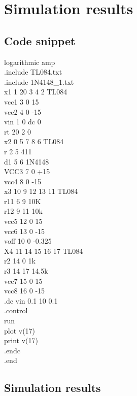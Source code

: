 \documentclass[12pt]{article}
\begin{document}



\section{Simulation results}%
\subsection{Code snippet}
logarithmic amp\\
.include TL084.txt\\
.include 1N4148\_1.txt\\

x1 1 20 3 4 2 TL084\\
vcc1 3 0 15\\
vcc2 4 0 -15\\
vin 1 0 dc 0\\
rt 20 2 0\\
x2 0 5 7 8 6 TL084\\ 
r 2 5 411\\
d1 5 6 1N4148\\
VCC3 7 0 +15\\
vcc4 8 0 -15\\
x3 10 9 12 13 11 TL084\\
r11 6 9 10K\\
r12 9 11 10k\\
vcc5 12 0 15\\
vcc6 13 0 -15\\
voff 10 0 -0.325\\
X4 11 14 15 16 17 TL084\\
r2 14 0 1k\\
r3 14 17 14.5k\\
vcc7 15 0 15\\
vcc8 16 0 -15\\
.dc vin 0.1 10 0.1\\
.control\\
run\\
plot v(17)\\ 
print v(17)\\
.endc \\
.end\\







\subsection{Simulation results}
\end{document}
